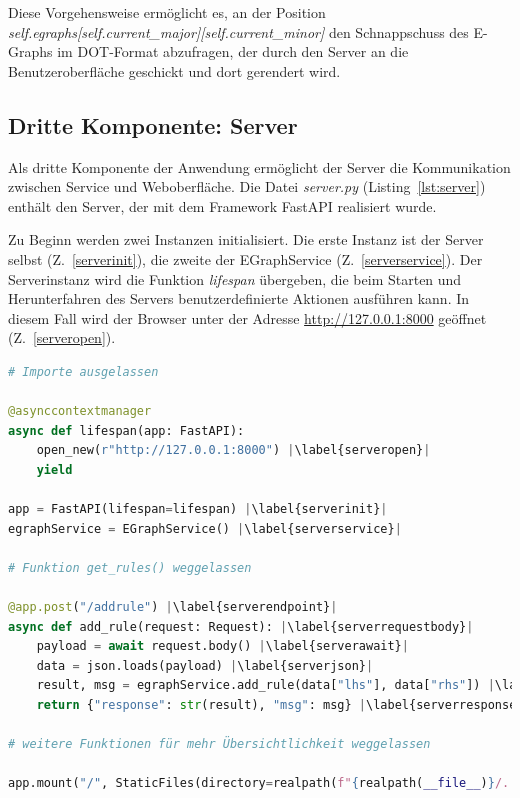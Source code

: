 Diese Vorgehensweise ermöglicht es, an der Position \textit{self.egraphs[self.current\_major][self.current\_minor]} den Schnappschuss des E-Graphs im DOT-Format abzufragen,
der durch den Server an die Benutzeroberfläche geschickt und dort gerendert wird.

\subsection{Dritte Komponente: Server}

Als dritte Komponente der Anwendung ermöglicht der Server die Kommunikation zwischen Service und Weboberfläche. 
Die Datei \textit{server.py} (Listing~\ref{lst:server}) enthält den Server, der mit dem Framework FastAPI realisiert wurde.

\noindent Zu Beginn werden zwei Instanzen initialisiert. Die erste Instanz ist der Server selbst (Z.~\ref{serverinit}), die zweite der EGraphService (Z.~\ref{serverservice}).
Der Serverinstanz wird die Funktion \textit{lifespan} übergeben, die beim Starten und Herunterfahren des Servers benutzerdefinierte Aktionen ausführen kann.
In diesem Fall wird der Browser unter der Adresse \url{http://127.0.0.1:8000} geöffnet (Z.~\ref{serveropen}).

\begin{lstlisting}[language=Python, escapechar=|, caption=Auszug aus der Datei \textit{server.py}, label={lst:server}]
# Importe ausgelassen 

@asynccontextmanager
async def lifespan(app: FastAPI):
    open_new(r"http://127.0.0.1:8000") |\label{serveropen}|
    yield

app = FastAPI(lifespan=lifespan) |\label{serverinit}|
egraphService = EGraphService() |\label{serverservice}|

# Funktion get_rules() weggelassen

@app.post("/addrule") |\label{serverendpoint}|
async def add_rule(request: Request): |\label{serverrequestbody}|
    payload = await request.body() |\label{serverawait}|
    data = json.loads(payload) |\label{serverjson}|
    result, msg = egraphService.add_rule(data["lhs"], data["rhs"]) |\label{serveraction}|
    return {"response": str(result), "msg": msg} |\label{serverresponse}|

# weitere Funktionen für mehr Übersichtlichkeit weggelassen 

app.mount("/", StaticFiles(directory=realpath(f"{realpath(__file__)}/../static"), html=True), name="static") |\label{serverend}|
\end{lstlisting} 


